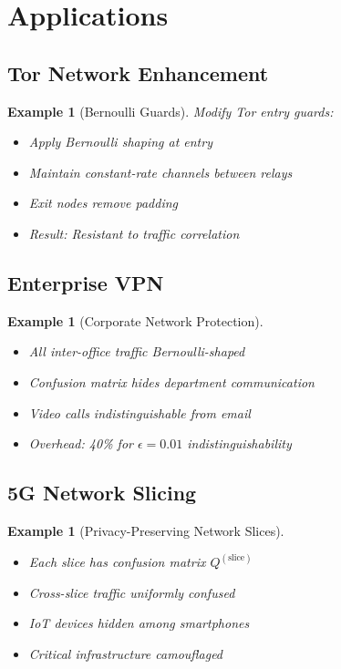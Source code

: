 \documentclass[11pt,final]{article}
\newtheorem{example}[theorem]{Example}
\begin{document}
\section{Applications}

\subsection{Tor Network Enhancement}

\begin{example}[Bernoulli Guards]
Modify Tor entry guards:
\begin{itemize}
    \item Apply Bernoulli shaping at entry
    \item Maintain constant-rate channels between relays
    \item Exit nodes remove padding
    \item Result: Resistant to traffic correlation
\end{itemize}
\end{example}

\subsection{Enterprise VPN}

\begin{example}[Corporate Network Protection]
\begin{itemize}
    \item All inter-office traffic Bernoulli-shaped
    \item Confusion matrix hides department communication
    \item Video calls indistinguishable from email
    \item Overhead: 40\% for $\epsilon = 0.01$ indistinguishability
\end{itemize}
\end{example}

\subsection{5G Network Slicing}

\begin{example}[Privacy-Preserving Network Slices]
\begin{itemize}
    \item Each slice has confusion matrix $Q^{(\text{slice})}$
    \item Cross-slice traffic uniformly confused
    \item IoT devices hidden among smartphones
    \item Critical infrastructure camouflaged
\end{itemize}
\end{example}
\end{document}

